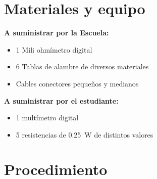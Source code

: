 \documentclass[12pt,letterpaper]{report}
\newcommand{\mat}{Materiales y equipo}
\newcommand{\pro}{Procedimiento}
\begin{document}
\section{\mat}
\textbf{A suministrar por la Escuela:}
\begin{itemize}
\item	1 Mili ohmímetro digital
\item	6 Tablas de alambre de diversos materiales
\item	Cables conectores pequeños y medianos
\end{itemize}
\textbf{A suministrar por el estudiante:}
\begin{itemize}
\item	1 multímetro digital
\item	5 resistencias de \SI{0,25}{\watt} de distintos valores
\end{itemize}
\section{\pro}
\end{document}
